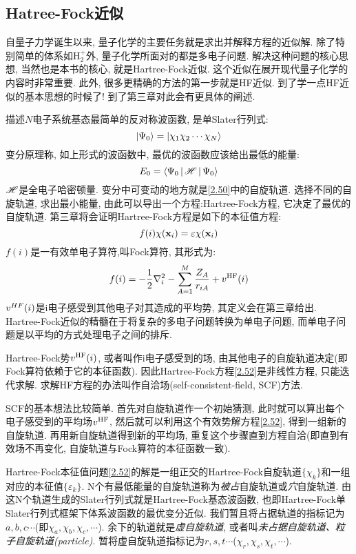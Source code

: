 \subsection{Hatree-Fock近似}
 \label{sec2.2.4}
自量子力学诞生以来, 量子化学的主要任务就是求出并解释\sch 方程的近似解. 除了特别简单的体系如$\text{H}^+_2$外, 量子化学所面对的都是多电子问题. 解决这种问题的核心思想, 当然也是本书的核心, 就是Hartree-Fock近似. 这个近似在展开现代量子化学的内容时非常重要. 此外, 很多更精确的方法的第一步就是HF近似. 到了学一点HF近似的基本思想的时候了! 到了第三章对此会有更具体的阐述.

描述$N$电子系统基态最简单的反对称波函数, 是单Slater行列式:
\begin{equation}
\label{2.50}
\Ket{\Psi_0}=\Ket{\chi_1\chi_2\cdots\chi_N}
\end{equation}
变分原理称, 如上形式的波函数中, 最优的波函数应该给出最低的能量:
\begin{equation}
E_0=\Braket{\Psi_0|\mathscr{H}|\Psi_0}
\end{equation}
$\mathscr{H}$是全电子哈密顿量. 变分中可变动的地方就是\ref{2.50}中的自旋轨道. 选择不同的自旋轨道, 求出最小能量, 由此可以导出一个方程:Hartree-Fock方程, 它决定了最优的自旋轨道. 第三章将会证明Hartree-Fock方程是如下的本征值方程:
\begin{equation}
f(i)\chi(\mathbf{x}_i)=\varepsilon\chi(\mathbf{x}_i)
\label{2.52}
\end{equation}
$f(i)$是一有效单电子算符,叫Fock算符, 其形式为:
\begin{equation}
\label{2.53}
f(i)=-\frac{1}{2}\nabla_i^2 - \sum_{A=1}^M\frac{Z_A}{r_{iA}} + v^{\rm HF}(i)
\end{equation}
$v^{HF\rm}(i)$是i电子感受到其他电子对其造成的平均势, 其定义会在第三章给出. Hartree-Fock近似的精髓在于将复杂的多电子问题转换为单电子问题, 而单电子问题是以平均的方式处理电子之间的排斥.

Hartree-Fock势$v^{\rm HF}(i)$, 或者叫作i电子感受到的场, 由其他电子的自旋轨道决定(即Fock算符依赖于它的本征函数).  因此Hartree-Fock方程\ref{2.52}是非线性方程, 只能迭代求解. 求解HF方程的办法叫作自洽场(self-consistent-field, SCF)方法.

SCF的基本想法比较简单. 首先对自旋轨道作一个初始猜测, 此时就可以算出每个电子感受到的平均场$v^{\rm HF}$, 然后就可以利用这个有效势解方程\ref{2.52}, 得到一组新的自旋轨道. 再用新自旋轨道得到新的平均场, 重复这个步骤直到方程自洽(即直到有效场不再变化, 自旋轨道与Fock算符的本征函数一致).

Hartree-Fock本征值问题\ref{2.52}的解是一组正交的Hartree-Fock自旋轨道$\{\chi_k\}$和一组对应的本征值$\{\varepsilon_k\}$. N个有最低能量的自旋轨道称为\emph{被占}自旋轨道或\emph{穴}自旋轨道. 由这N个轨道生成的Slater行列式就是Hartree-Fock基态波函数, 也即Hartree-Fock单Slater行列式框架下体系波函数的最优变分近似. 我们暂且将占据轨道的指标记为$a,b,c\cdots$(即$\chi_a,\chi_b,\chi_c,\cdots$). 余下的轨道就是\emph{虚自旋轨道}, 或者叫\emph{未占据自旋轨道、粒子自旋轨道(particle)}. 暂将虚自旋轨道指标记为$r,s,t\cdots$($\chi_r,\chi_s,\chi_t,\cdots$).

